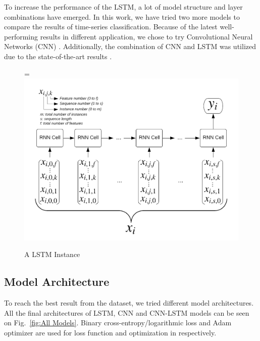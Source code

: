 \documentclass[12pt,oneandhalf,chaparabic,lfm,phd,eng,oneside,pntc]{gsufbe}
\makeatletter
\let\old@includegraphics\includegraphics
\renewcommand{\includegraphics}[2][,]{%
  \setbox9=\hbox{\old@includegraphics[#1]{#2}}%
  \ifdim\wd9>\textwidth
    \old@includegraphics[#1,width=\textwidth]{#2}%
  \else
    \old@includegraphics[#1]{#2}%
  \fi%
}
\makeatother
\begin{document}
To increase the performance of the LSTM, a lot of model structure and layer combinations have emerged. In this work, we have tried two more models to compare the results of time-series classification. Because of the latest well-performing results in different application, we chose to try Convolutional Neural Networks (CNN) \cite{lecun1995convolutional}. Additionally, the combination of CNN and LSTM \cite{wang2016dimensional} was utilized due to the state-of-the-art results \cite{karim2018lstm}.

\begin{figure}[t]\vspace*{4pt}
\centerline{\includegraphics[width=160mm]{graphics/One_LSTM_Instance.png}}
\caption{A LSTM Instance}
\label{fig:LSTM Instance}
\end{figure}

\subsection{Model Architecture}
\label{subsec:Model Architecture}
To reach the best result from the dataset, we tried different model architectures. All the final architectures of LSTM, CNN and CNN-LSTM models can be seen on Fig.~\ref{fig:All Models}. Binary cross-entropy/logarithmic loss and Adam optimizer are used for loss function and optimization in respectively.
\end{document}
